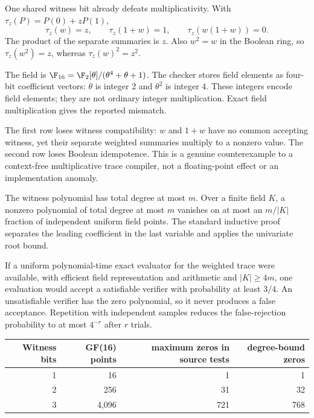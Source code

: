 One shared witness bit already defeats multiplicativity. With
$\tau_z(P)=P(0)+zP(1)$,
\[
 \tau_z(w)=z,\qquad \tau_z(1+w)=1,
 \qquad \tau_z(w(1+w))=0.
\]
The product of the separate summaries is $z$. Also $w^2=w$ in the Boolean
ring, so $\tau_z(w^2)=z$, whereas $\tau_z(w)^2=z^2$.


The field is $\F_{16}=\F_2[\theta]/(\theta^4+\theta+1)$. The checker stores
field elements as four-bit coefficient vectors: $\theta$ is integer 2 and
$\theta^2$ is integer 4. These integers encode field elements; they are not
ordinary integer multiplication. Exact field multiplication gives the
reported mismatch.

The first row loses witness compatibility: $w$ and $1+w$ have no common
accepting witness, yet their separate weighted summaries multiply to a
nonzero value. The second row loses Boolean idempotence. This is a genuine
counterexample to a context-free multiplicative trace compiler, not a
floating-point effect or an implementation anomaly.


The witness polynomial has total degree at most $m$. Over a finite field
$K$, a nonzero polynomial of total degree at most $m$ vanishes on at most
an $m/|K|$ fraction of independent uniform field points. The standard
inductive proof separates the leading coefficient in the last variable
and applies the univariate root bound.

If a uniform polynomial-time exact evaluator for the weighted trace were
available, with efficient field representation and arithmetic and
$|K|\ge4m$, one evaluation would accept a satisfiable verifier with
probability at least $3/4$. An unsatisfiable verifier has the zero polynomial,
so it never produces a false acceptance. Repetition with independent samples
reduces the false-rejection probability to at most $4^{-r}$ after $r$ trials.

\begin{center}
\begin{tabular}{@{}rrrr@{}}\toprule
Witness bits & GF(16) points & maximum zeros in source tests & degree-bound zeros\\\midrule
1 & 16 & 1 & 1\\
2 & 256 & 31 & 32\\
3 & 4,096 & 721 & 768\\\bottomrule
\end{tabular}
\end{center}

